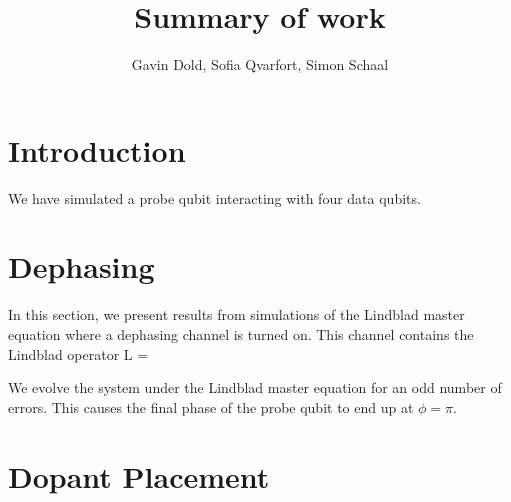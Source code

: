 


\title{Summary of work}
\author{Gavin Dold, Sofia Qvarfort, Simon Schaal}
\maketitle
\tableofcontents
\section{Introduction}
We have simulated a probe qubit interacting with four data qubits. 


\section{Dephasing}
In this section, we present results from simulations of the Lindblad master equation where a dephasing channel is turned on. This channel contains the Lindblad operator
\beq
L  = 
\eeq

We evolve the system under the Lindblad master equation for an odd number of errors. This causes the final phase of the probe qubit to end up at $\phi = \pi$. 

\section{Dopant Placement}

